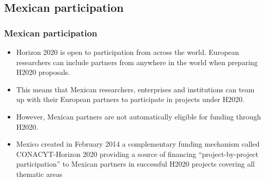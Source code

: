 \documentclass[compress,9pt,xcolor={dvipsnames,table}]{beamer}
\begin{document}
\subsection{Mexican participation}
\begin{frame}\frametitle{Mexican participation}
\begin{itemize}
  \item Horizon 2020 is open to participation from across the world.
  European researchers can include partners from anywhere in the world when preparing H2020 proposals.
  \item This means that Mexican researchers, enterprises and institutions can team up with their European partners to participate in projects under H2020.
  \item However, Mexican partners are not automatically eligible for funding through H2020.
  \item Mexico created in February 2014 a complementary funding mechanism called CONACYT-Horizon 2020 providing a source of financing ``project-by-project participation'' to Mexican partners in successful H2020 projects covering all thematic areas
\end{itemize}
\end{frame}
\end{document}
